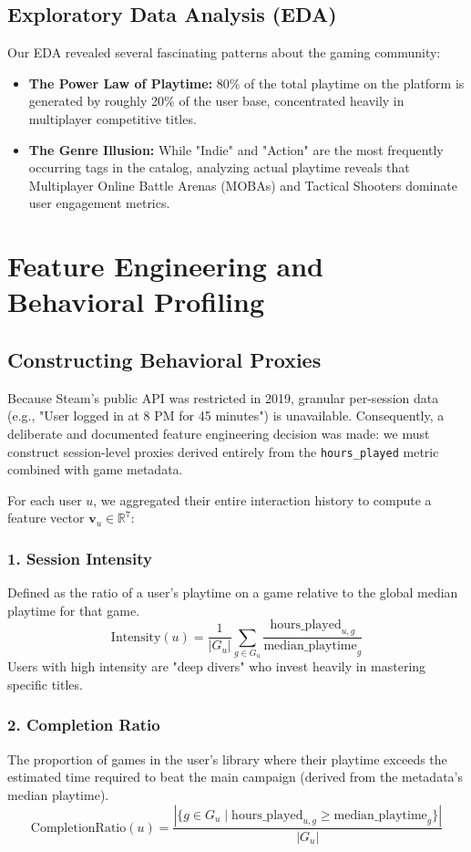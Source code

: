 \documentclass[12pt, a4paper]{report}
\begin{document}
\section{Exploratory Data Analysis (EDA)}
Our EDA revealed several fascinating patterns about the gaming community:
\begin{itemize}
    \item \textbf{The Power Law of Playtime:} 80\% of the total playtime on the platform is generated by roughly 20\% of the user base, concentrated heavily in multiplayer competitive titles.
    \item \textbf{The Genre Illusion:} While "Indie" and "Action" are the most frequently occurring tags in the catalog, analyzing actual playtime reveals that Multiplayer Online Battle Arenas (MOBAs) and Tactical Shooters dominate user engagement metrics.
\end{itemize}

\chapter{Feature Engineering and Behavioral Profiling}
\section{Constructing Behavioral Proxies}
Because Steam's public API was restricted in 2019, granular per-session data (e.g., "User logged in at 8 PM for 45 minutes") is unavailable. Consequently, a deliberate and documented feature engineering decision was made: we must construct session-level proxies derived entirely from the \texttt{hours\_played} metric combined with game metadata. 

For each user $u$, we aggregated their entire interaction history to compute a feature vector $\mathbf{v}_u \in \mathbb{R}^7$:

\subsection{1. Session Intensity}
Defined as the ratio of a user's playtime on a game relative to the global median playtime for that game. 
\[ \text{Intensity}(u) = \frac{1}{|G_u|} \sum_{g \in G_u} \frac{\text{hours\_played}_{u,g}}{\text{median\_playtime}_g} \]
Users with high intensity are "deep divers" who invest heavily in mastering specific titles.

\subsection{2. Completion Ratio}
The proportion of games in the user's library where their playtime exceeds the estimated time required to beat the main campaign (derived from the metadata's median playtime).
\[ \text{CompletionRatio}(u) = \frac{|\{ g \in G_u \mid \text{hours\_played}_{u,g} \geq \text{median\_playtime}_g \}|}{|G_u|} \]
\end{document}
